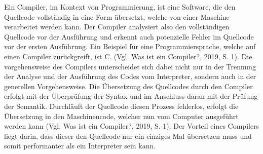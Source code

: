 Ein Compiler, im Kontext von Programmierung, ist eine Software, die den Quellcode vollständig in eine Form übersetzt, welche von einer Maschine verarbeitet werden kann. Der Compiler analysiert also den vollständigen Quellcode vor der Ausführung und erkennt auch potenzielle Fehler im Quellcode vor der ersten Ausführung. Ein Beispiel für eine Programmiersprache, welche auf einen Compiler zurückgreift, ist C. (Vgl. Was ist ein Compiler?, 2019, S. 1).
Die vorgehensweise des Compilers unterscheidet sich dabei nicht nur in der Trennung der Analyse und der Ausführung des Codes vom Interpreter, sondern auch in der generellen Vorgehensweise.
Die Übersetzung des Quellcodes durch den Compiler erfolgt mit der Überprüfung der Syntax und im Anschluss daran mit der Prüfung der Semantik. Durchläuft der Quellcode diesen Prozess fehlerlos, erfolgt die Übersetzung in den Maschinencode, welcher nun vom Computer ausgeführt werden kann (Vgl. Was ist ein Compiler?, 2019, S. 1).
Der Vorteil eines Compilers liegt darin, dass dieser den Quellcode nur ein einziges Mal übersetzen muss und somit performanter als ein Interpreter sein kann.
